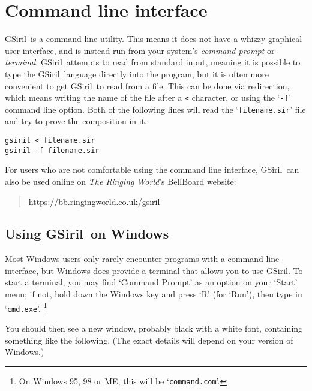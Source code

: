 \documentclass[a4paper,11pt,oneside]{book}
\makeatletter
\def\textitidx#1{\textit{#1}\index{#1}}
\newcommand{\oi}[1]{\index{#1@{\hspace*{-\optwidth}\texttt{-}\texttt{#1}}}}
\newcommand{\ttcmdidx}[1]{\texttt{#1}\index{#1@{\texttt{#1}}}}
\def\gsiril{GSiril}
\makeatother
\begin{document}
\section{Command line interface}\label{cli}

\gsiril\ is a command line utility.  This means it does not have a
whizzy graphical user interface, and is instead run from your system's
\textit{command prompt}%
 or \textitidx{terminal}.
\gsiril\ attempts to read from standard input,
meaning it is possible to type the \gsiril\ language directly into the
program, but it is often more convenient to get \gsiril\ to read from a file.
This can be done via redirection,%
 which means writing the name of the
file after a \verb+<+ character, or using the `\verb+-f+' command line
option\oi{f}.  Both of the following lines will read the `\verb+filename.sir+'
file and try to prove the composition in it.

\begin{Verbatim}
gsiril < filename.sir
gsiril -f filename.sir
\end{Verbatim}

For users who are not comfortable using the command line interface,
\gsiril\ can also be used online on \textit{The Ringing World}'s
BellBoard website:

\begin{quotation}
\url{https://bb.ringingworld.co.uk/gsiril}
\end{quotation}

\subsection{Using \gsiril\ on Windows}

Most Windows users only rarely encounter programs with a command line
interface, but Windows does provide a terminal that allows you to use
\gsiril.  To start a terminal, you may find `Command Prompt' as an
option on your `Start' menu; if not, hold down the Windows key and press
`R' (for `Run'), then type in  `\ttcmdidx{cmd.exe}'.%
\footnote{On Windows 95, 98 or ME, this will be `\texttt{command.com}'.%
}

You should then see a new window, probably black with a white font, 
containing something like the following.  (The exact details will 
depend on your version of Windows.)
\end{document}
